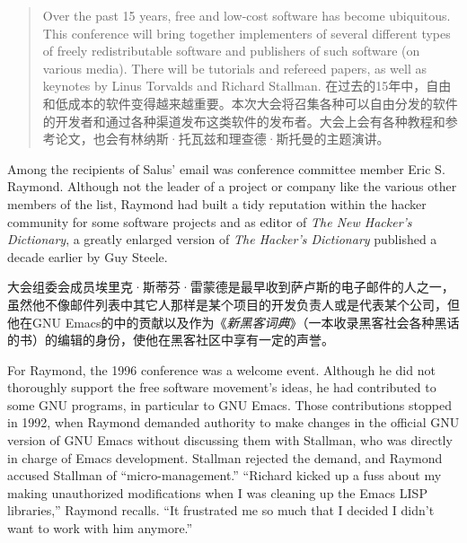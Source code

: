 \begin{quote}
\ifdefined\eng
Over the past 15 years, free and low-cost software has become ubiquitous. This conference will bring together implementers of several different types of freely redistributable software and publishers of such software (on various media). There will be tutorials and refereed papers, as well as keynotes by Linus Torvalds and Richard Stallman.
\fi
\ifdefined\chs
在过去的15年中，自由和低成本的软件变得越来越重要。本次大会将召集各种可以自由分发的软件的开发者和通过各种渠道发布这类软件的发布者。大会上会有各种教程和参考论文，也会有林纳斯·托瓦兹和理查德·斯托曼的主题演讲。
\fi
\end{quote}

\ifdefined\eng
Among the recipients of Salus' email was conference committee member Eric S. Raymond. Although not the leader of a project or company like the various other members of the list, Raymond had built a tidy reputation within the hacker community for some software projects and as editor of \textit{The New Hacker's Dictionary}, a greatly enlarged version of \textit{The Hacker's Dictionary} published a decade earlier by Guy Steele.
\fi

\ifdefined\chs
大会组委会成员埃里克·斯蒂芬·雷蒙德是最早收到萨卢斯的电子邮件的人之一，虽然他不像邮件列表中其它人那样是某个项目的开发负责人或是代表某个公司，但他在GNU Emacs的中的贡献以及作为《\textit{新黑客词典}》（一本收录黑客社会各种黑话的书）的编辑的身份，使他在黑客社区中享有一定的声誉。
\fi

\ifdefined\eng
For Raymond, the 1996 conference was a welcome event. Although he did not thoroughly support the free software movement's ideas, he had contributed to some GNU programs, in particular to GNU Emacs. Those contributions stopped in 1992, when Raymond demanded authority to make changes in the official GNU version of GNU Emacs without discussing them with Stallman, who was directly in charge of Emacs development.  Stallman rejected the demand, and Raymond accused Stallman of ``micro-management.''  ``Richard kicked up a fuss about my making unauthorized modifications when I was cleaning up the Emacs LISP libraries,'' Raymond recalls. ``It frustrated me so much that I decided I didn't want to work with him anymore.''
\fi

